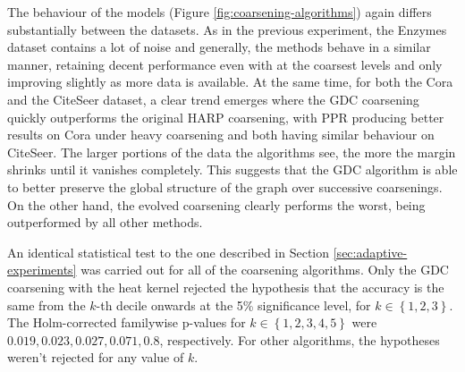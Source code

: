 The behaviour of the models (Figure \ref{fig:coarsening-algorithms}) again differs substantially between the datasets. As in the previous experiment, the Enzymes dataset contains a lot of noise and generally, the methods behave in a similar manner, retaining decent performance even with at the coarsest levels and only improving slightly as more data is available. At the same time, for both the Cora and the CiteSeer dataset, a clear trend emerges where the GDC coarsening quickly outperforms the original HARP coarsening, with PPR producing better results on Cora under heavy coarsening and both having similar behaviour on CiteSeer. The larger portions of the data the algorithms see, the more the margin shrinks until it vanishes completely. This suggests that the GDC algorithm is able to better preserve the global structure of the graph over successive coarsenings. On the other hand, the evolved coarsening clearly performs the worst, being outperformed by all other methods.

An identical statistical test to the one described in Section \ref{sec:adaptive-experiments} was carried out for all of the coarsening algorithms. Only the GDC coarsening with the heat kernel rejected the hypothesis that the accuracy is the same from the \( k \)-th decile onwards at the 5\% significance level, for \( k \in \left\{ 1, 2, 3 \right\} \). The Holm-corrected familywise p-values for \( k \in \left\{ 1, 2, 3, 4, 5 \right\} \) were \( 0.019, 0.023, 0.027, 0.071, 0.8 \), respectively. For other algorithms, the hypotheses weren't rejected for any value of \( k \).
